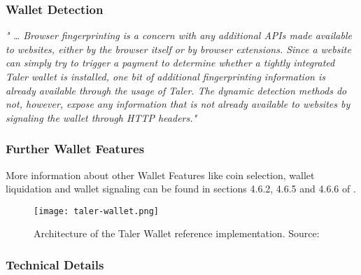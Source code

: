 \subsubsection{Wallet Detection}
\begin{center}
    \textit{
        " \dots
        Browser fingerprinting is a concern with any additional APIs made available to websites, either by the browser itself or by browser extensions.
        Since a website can simply try to trigger a payment to determine whether a tightly integrated Taler wallet is installed, one bit of additional fingerprinting information is already available through the usage of Taler.
        The dynamic detection methods do not, however, expose any information that is not already available to websites by signaling the wallet through HTTP headers."
    }
\end{center}

\subsubsection{Further Wallet Features}
More information about other Wallet Features like coin selection, wallet liquidation and wallet signaling can be found in sections 4.6.2, 4.6.5 and 4.6.6 of \cite{dold:the-gnu-taler-system}.

\begin{figure}[h!]
    \centering
    \texttt{[image: taler-wallet.png]}
    \caption{Architecture of the Taler Wallet reference implementation. Source: \cite{dold:the-gnu-taler-system}}
    \label{fig:taler-wallet-reference-impl}
\end{figure}

\subsubsection{Technical Details}

